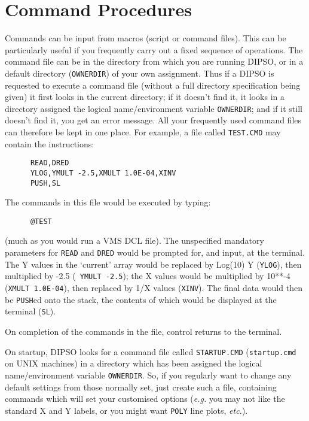 \section {Command Procedures}

Commands can be input from macros (script or command files). This can
be particularly useful if you frequently carry out a fixed sequence of
operations. The command file can be in the directory from which you
are running DIPSO, or in a default directory ({\tt OWNERDIR}) of your own
assignment. Thus if a DIPSO is requested to execute a command file
(without a full directory specification being given) it first looks in
the current directory;  if it doesn't find it, it looks in a directory
assigned the logical name/environment variable {\tt OWNERDIR}; and if it
still doesn't find it, you get an error message. All your frequently
used command files can therefore be kept in one place. For example, a
file called {\tt TEST.CMD} may contain the instructions:

\begin{verbatim}
      READ,DRED
      YLOG,YMULT -2.5,XMULT 1.0E-04,XINV
      PUSH,SL
\end{verbatim}

The commands in this file would be executed by typing:

\begin{verbatim}
      @TEST
\end{verbatim}

(much as you would run a VMS DCL file). The unspecified mandatory
parameters for {\tt READ} and {\tt DRED} would be prompted for, and
input, at the terminal. The Y values in the `current' array would be
replaced by Log(10) Y ({\tt YLOG}), then multiplied by -2.5 ({\tt
YMULT -2.5}); the X values would be multiplied by 10**-4 ({\tt XMULT
1.0E-04}), then replaced by 1/X values ({\tt XINV}). The final data
would then be {\tt PUSH}ed onto the stack, the contents of which would
be displayed at the terminal ({\tt SL}).

On completion of the commands in the file, control returns to the terminal.

On startup, DIPSO looks for a command file called {\tt STARTUP.CMD} 
({\tt startup.cmd} on UNIX machines) in a directory which has been
assigned the logical name/environment variable {\tt OWNERDIR}. So, if
you regularly want to change any default settings from those normally
set, just create such a file, containing commands which will set your
customised options ({\em e.g.} you may not like the standard X and Y
labels, or you might want {\tt POLY} line plots, {\em etc.}).

